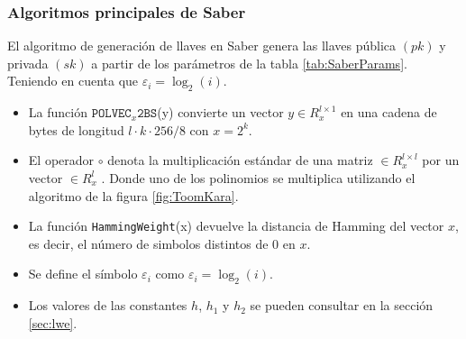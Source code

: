 \subsubsection{Algoritmos principales de Saber \cite{saber-spec-2020} }
 El algoritmo de generación de llaves en Saber genera las llaves pública \((pk)\) y privada \((sk)\) a partir de los parámetros de la tabla \ref{tab:SaberParams}. Teniendo en cuenta que \(\varepsilon_i=\log_2 (i)\).
 \begin{itemize}
 	\item La función $\texttt{POLVEC}_x\texttt{2BS}$(y) convierte un vector \(y\in R_x^{l\times 1}\) en una cadena de bytes de longitud \(l\cdot k \cdot 256/8\) con \(x=2^k\).
 	\item El operador \(\circ\) denota la multiplicación estándar de una matriz \(\in R_x^{l\times l}\) por un vector \(\in R_x^{l}\) . Donde uno de los polinomios se multiplica utilizando el algoritmo de la figura \ref{fig:ToomKara}.
 	\item La función \texttt{HammingWeight}(x) devuelve la distancia de Hamming del vector \(x\), es decir, el número de simbolos distintos de \(0\) en \(x\).
 	\item Se define el símbolo $\varepsilon_i$ como \(\varepsilon_i=\log_2 (i)\).
 	\item Los valores de las constantes \(h\), \(h_1\) y \(h_2\) se pueden consultar en la sección \ref{sec:lwe}.
 \end{itemize}
 \newpage
